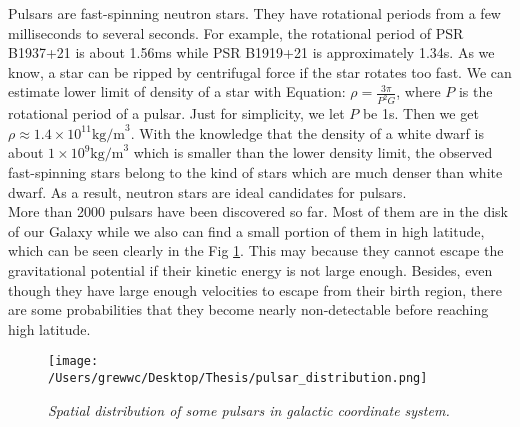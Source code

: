 \documentclass[12pt]{report}
\newcommand{\add}[1]{
  $<$\colorbox{red}{\textbf{add}}$>$#1$<$\colorbox{red}{\textbf{/add}}$>$
}
\begin{document}
        Pulsars are fast-spinning neutron stars. They have rotational periods from a few 
        milliseconds to several seconds. For example, the rotational period of PSR B1937+21 is about 1.56ms 
        while PSR B1919+21 is approximately 1.34s. As we know, a star can be ripped by centrifugal force if the
        star rotates too fast. We can estimate lower limit of density of a star with Equation: 
        $\rho=\frac{3\pi}{P^2G}$, where $P$ is the rotational period of a pulsar. Just for simplicity, we
        let $P$ be 1s. Then we get $\rho\approx 1.4\times 10^{11}\mbox{kg/m}^3$. With the knowledge that the 
        density of a white dwarf is about $1\times 10^9\mbox{kg/m}^3$ which is smaller than the lower density limit,
        the observed fast-spinning stars belong to the kind of stars which are much denser 
        than white dwarf. As a result, neutron stars are ideal candidates for pulsars. \\
        \indent
        More than 2000 pulsars have been discovered so far. Most of them are in the disk of our Galaxy 
        while we also can find a small portion of them in high latitude, which can be seen clearly in the Fig 
        \ref{fig: spatial_distribution}. This may 
        because they cannot escape the gravitational potential if their kinetic energy is not large enough. Besides,
        even though they have large enough velocities to escape from their birth region, there are some 
        probabilities that they become nearly non-detectable before reaching high latitude. 

        \begin{figure}[h]
          \centering
          \texttt{[image: /Users/grewwc/Desktop/Thesis/pulsar\_distribution.png]}
          \caption{\textit{\footnotesize Spatial distribution of some pulsars in galactic coordinate system.}}
          \label{fig: spatial_distribution}
        \end{figure}
        



\end{document}
